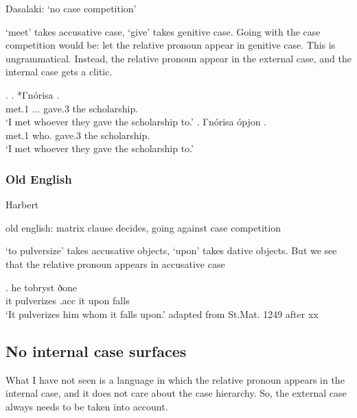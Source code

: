 Dasalaki: `no case competition'

`meet' takes accusative case, `give' takes genitive case. Going with the case competition would be: let the relative pronoun appear in genitive case. This is ungrammatical. Instead, the relative pronoun appear in the external case, and the internal case gets a clitic.

\ex.
\ag. *Γnórisa    .\\
met.1 ... gave.3 the scholarship.\\
`I met whoever they gave the scholarship to.'
\bg. Γnórisa ópjon    .\\
met.1 who.  gave.3 the scholarship.\\
`I met whoever they gave the scholarship to.'



\subsubsection{Old English}

Harbert

old english: matrix clause decides, going against case competition

 `to pulversize' takes accusative objects,  `upon' takes dative objects. But we see that the relative pronoun appears in accusative case

\exg. he tobryst ðone    \\
 it pulverizes\scsub{[acc]} .\ac{acc}  it upon\scsub{[dat]} falls\\
`It pulverizes him whom it falls upon.' adapted from St.Mat. 1249 after xx


\subsection{No internal case surfaces}

What I have not seen is a language in which the relative pronoun appears in the internal case, and it does not care about the case hierarchy. So, the external case always needs to be taken into account.

